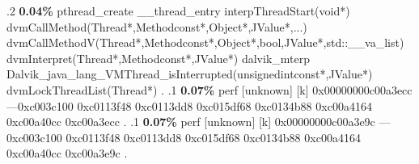 \begin{profile}
{.2 \textbf{0.04\%} pthread\_create\newline {} \_\_thread\_entry\newline {} interpThreadStart(void*)\newline {} dvmCallMethod(Thread*,Methodconst*,Object*,JValue*,...)\newline {} dvmCallMethodV(Thread*,Methodconst*,Object*,bool,JValue*,std::\_\_va\_list)\newline {} dvmInterpret(Thread*,Methodconst*,JValue*)\newline {} dalvik\_mterp\newline {} Dalvik\_java\_lang\_VMThread\_isInterrupted(unsignedintconst*,JValue*)\newline {} dvmLockThreadList(Thread*)\newline {} . 
.1 \textbf{ 0.07\%} perf             [unknown]              [k] 0x00000000c00a3ecc\newline {} ---0xc003c100\newline {} 0xc0113f48\newline {} 0xc0113dd8\newline {} 0xc015df68\newline {} 0xc0134b88\newline {} 0xc00a4164\newline {} 0xc00a40cc\newline {} 0xc00a3ecc\newline {} . 
.1 \textbf{ 0.07\%} perf             [unknown]              [k] 0x00000000c00a3e9c\newline {} ---0xc003c100\newline {} 0xc0113f48\newline {} 0xc0113dd8\newline {} 0xc015df68\newline {} 0xc0134b88\newline {} 0xc00a4164\newline {} 0xc00a40cc\newline {} 0xc00a3e9c\newline {} . 
}
\end{profile}
